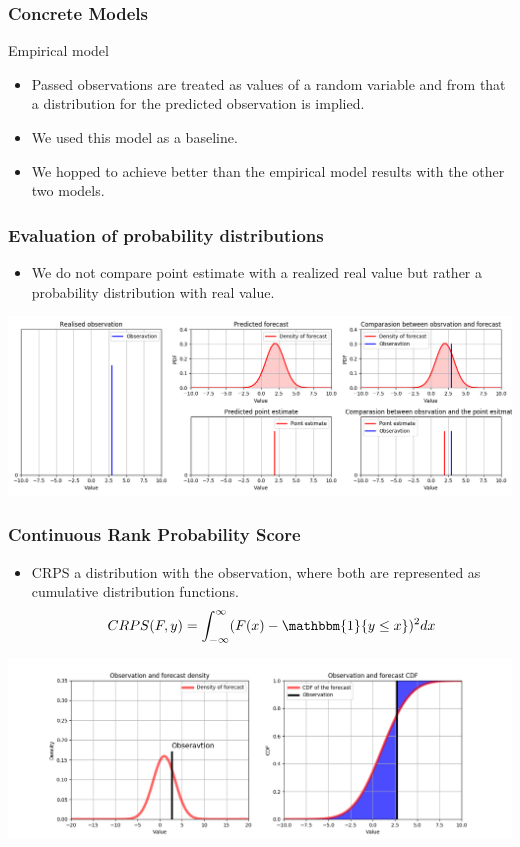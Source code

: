 \documentclass[18pt]{beamer}
\begin{document}
\begin{frame}
  \frametitle{Concrete Models}
  Empirical model
   \begin{itemize}
   \item Passed observations are treated as values of a random variable and from that a distribution for the predicted observation is implied.
   \item We used this model as a baseline.
   \item We hopped to achieve better than the empirical model results with the other two models.
   \end{itemize}

 \end{frame}

\begin{frame}
  \frametitle{Evaluation of probability distributions}
  \begin{itemize}
  \item We do not compare point estimate with a realized real value but rather a probability distribution with real value.
  \end{itemize}
  \begin{center}
    \includegraphics[scale=0.32]{images/distribution_point}
  \end{center}
\end{frame}

\begin{frame}
  \frametitle{Continuous Rank Probability Score}
  \begin{itemize}
  \item CRPS a distribution with the observation, where both are represented as cumulative distribution functions.
    $$  CRPS(F,y)  = \int_{-\infty}^{\infty}(F(x) - \mathbbm{1}\{y \leq x \})^2dx $$
  \end{itemize}
  \includegraphics[scale=0.35]{images/crps}
\end{frame}
\end{document}
